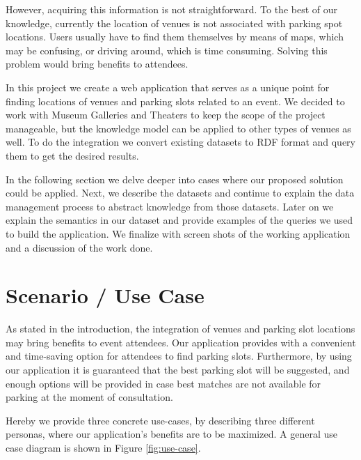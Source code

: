 \documentclass[runningheads,a4paper]{../../StyleFiles/llncs}
\begin{document}
However, acquiring this information is not straightforward. To the best of our knowledge, currently the location of venues is not associated with parking spot locations. Users usually have to find them themselves by means of maps, which may be confusing, or driving around, which is time consuming. Solving this problem would bring benefits to attendees.

In this project we create a web application that serves as a unique point for finding locations of venues and parking slots related to an event. We decided to work with Museum Galleries and Theaters to keep the scope of the project manageable, but the knowledge model can be applied to other types of venues as well. To do the integration we convert existing datasets to RDF format and query them to get the desired results.

In the following section we delve deeper into cases where our proposed solution could be applied. Next, we describe the datasets and continue to explain the data management process to abstract knowledge from those datasets. Later on we explain the semantics in our dataset and provide examples of the queries we used to build the application. We finalize with screen shots of the working application and a discussion of the work done.  

\section{Scenario / Use Case}

As stated in the introduction, the integration of venues and parking slot locations may bring benefits to event attendees. Our application provides with a convenient and time-saving option for attendees to find parking slots. Furthermore, by using our application it is guaranteed that the best parking slot will be suggested, and enough options will be provided in case best matches are not available for parking at the moment of consultation.

Hereby we provide three concrete use-cases, by describing three different personas, where our application's benefits are to be maximized. A general use case diagram is shown in Figure \ref{fig:use-case}. 
\end{document}

